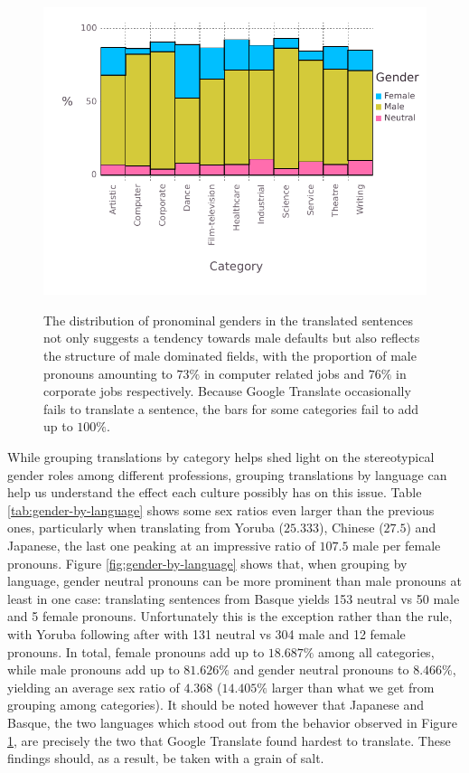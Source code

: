 \documentclass[jair,twoside,11pt,theapa]{article}
\begin{document}
\begin{figure}[H]
  \centering
  \includegraphics[width=\linewidth]{pictures/gender-by-category}
  \label{fig:gender-by-category}
  \caption{The distribution of pronominal genders in the translated sentences not only suggests a tendency towards male defaults but also reflects the structure of male dominated fields, with the proportion of male pronouns amounting to $73\%$ in computer related jobs and $76\%$ in corporate jobs respectively. Because Google Translate occasionally fails to translate a sentence, the bars for some categories fail to add up to $100\%$.}
\end{figure}

While grouping translations by category helps shed light on the stereotypical gender roles among different professions, grouping translations by language can help us understand the effect each culture possibly has on this issue. Table \ref{tab:gender-by-language} shows some sex ratios even larger than the previous ones, particularly when translating from Yoruba ($25.333$), Chinese ($27.5$) and Japanese, the last one peaking at an impressive ratio of $107.5$ male per female pronouns. Figure \ref{fig:gender-by-language} shows that, when grouping by language, gender neutral pronouns can be more prominent than male pronouns at least in one case: translating sentences from Basque yields 153 neutral vs 50 male and 5 female pronouns. Unfortunately this is the exception rather than the rule, with Yoruba following after with 131 neutral vs 304 male and 12 female pronouns. In total, female pronouns add up to $18.687\%$ among all categories, while male pronouns add up to $81.626\%$ and gender neutral pronouns to $8.466\%$, yielding an average sex ratio of $4.368$ ($14.405\%$ larger than what we get from grouping among categories). It should be noted however that Japanese and Basque, the two languages which stood out from the behavior observed in Figure \ref{fig:gender-by-category}, are precisely the two that Google Translate found hardest to translate. These findings should, as a result, be taken with a grain of salt.
\end{document}

